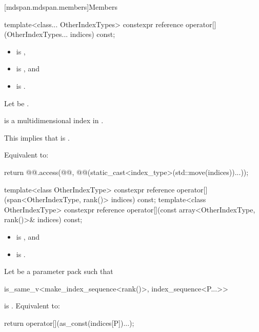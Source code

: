 [mdspan.mdspan.members]{Members}

%
\begin{itemdecl}
template<class... OtherIndexTypes>
  constexpr reference operator[](OtherIndexTypes... indices) const;
\end{itemdecl}

\begin{itemdescr}
\pnum
\constraints
\begin{itemize}
\item
{} is ,
\item
{} is , and
\item
{} is .
\end{itemize}

\pnum
Let  be .

\pnum
\expects
{} is a multidimensional index in .
\begin{note}
This implies that
is .
\end{note}

\pnum
\effects
Equivalent to:
\begin{codeblock}
return @@.access(@@, @@(static_cast<index_type>(std::move(indices))...));
\end{codeblock}
\end{itemdescr}

%
\begin{itemdecl}
template<class OtherIndexType>
  constexpr reference operator[](span<OtherIndexType, rank()> indices) const;
template<class OtherIndexType>
  constexpr reference operator[](const array<OtherIndexType, rank()>& indices) const;
\end{itemdecl}

\begin{itemdescr}
\pnum
\constraints
\begin{itemize}
\item
{} is , and
\item
{} is .
\end{itemize}

\pnum
\effects
Let  be a parameter pack such that
\begin{codeblock}
is_same_v<make_index_sequence<rank()>, index_sequence<P...>>
\end{codeblock}
is .
Equivalent to:
\begin{codeblock}
return operator[](as_const(indices[P])...);
\end{codeblock}
\end{itemdescr}

